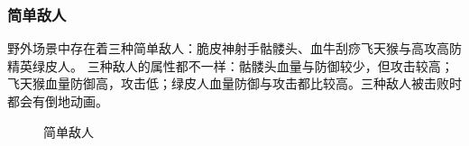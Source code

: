 \documentclass{ctexart}
\begin{document}
\subsubsection{简单敌人}
野外场景中存在着三种简单敌人：脆皮神射手骷髅头、血牛刮痧飞天猴与高攻高防精英绿皮人。
三种敌人的属性都不一样：骷髅头血量与防御较少，但攻击较高；飞天猴血量防御高，攻击低；绿皮人血量防御与攻击都比较高。三种敌人被击败时都会有倒地动画。
\begin{figure}[h]
\centering
{}
\caption{\label{fig:简单敌人}简单敌人}
\end{figure}
\end{document}
